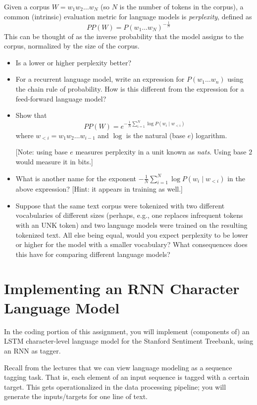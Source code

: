 \documentclass[11pt]{article}
\begin{document}
\vspace{2em}
 Given a corpus $W = w_1 w_2 \dots w_N$ (so $N$ is the number of tokens in the corpus), a common (intrinsic) evaluation metric for language models is \emph{perplexity}, defined as
\[ PP(W) = P(w_1 \dots w_N)^{-\frac{1}{N}} \]
This can be thought of as the inverse probability that the model assigns to the corpus, normalized by the size of the corpus.
\begin{itemize}
  \item Is a lower or higher perplexity better?
  \item For a recurrent language model, write an expression for $P(w_1 \dots w_n)$ using the chain rule of probability.  How is this different from the expression for a feed-forward language model?
  \item Show that
  \[ PP(W) = e^{-\frac{1}{N} \sum_{i=1}^N \log P(w_i \mid w_{<i})} \]
  where $w_{<i} = w_1 w_2 \dots w_{i-1}$ and $\log$ is the natural (base $e$) logarithm.
  
  [Note: using base $e$ measures perplexity in a unit known as \emph{nats}.  Using base $2$ would measure it in bits.]

  \item What is another name for the exponent $-\frac{1}{N} \sum_{i=1}^N \log P(w_i \mid w_{<i})$ in the above expression? [Hint: it appears in training as well.]
  \item Suppose that the same text corpus were tokenized with two different vocabularies of different sizes (perhaps, e.g., one replaces infrequent tokens with an UNK token) and two language models were trained on the resulting tokenized text.  All else being equal, would you expect perplexity to be lower or higher for the model with a smaller vocabulary?  What consequences does this have for comparing different language models?
\end{itemize}


\section{Implementing an RNN Character Language Model}

In the coding portion of this assignment, you will implement (components of) an LSTM character-level language model for the Stanford Sentiment Treebank, using an RNN as tagger.

\vspace{2em}
 Recall from the lectures that we can view language modeling as a sequence tagging task.  That is, each element of an input sequence is tagged with a certain target.  This gets operationalized in the data processing pipeline; you will generate the inputs/targets for one line of text.
\end{document}
